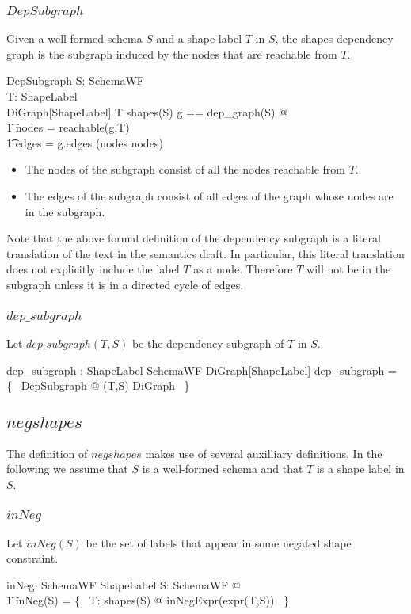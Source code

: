 \documentclass{article}
\begin{document}
\subsubsection{$DepSubgraph$}
Given a well-formed schema $S$ and a shape label $T$ in $S$, the shapes dependency
graph is the subgraph induced by the nodes that are reachable from $T$.
\begin{schema}{DepSubgraph}
	S: SchemaWF \\
	T: ShapeLabel \\
	DiGraph[ShapeLabel]
\where
	T \in shapes(S)
\also
	\LET g == dep\_graph(S) @ \\
\t1		nodes = reachable(g,T) \land \\
\t1		edges = g.edges \cap (nodes \cross nodes)
\end{schema}
\begin{itemize}
\item The nodes of the subgraph consist of all the nodes reachable from $T$.
\item The edges of the subgraph consist of all edges of the graph whose nodes are in the subgraph.
\end{itemize}

Note that the above formal definition of the dependency subgraph is a literal translation of the text in the semantics draft.
In particular, this literal translation does not explicitly include the label $T$ as a node.
Therefore $T$ will not be in the subgraph unless it is in a directed cycle of edges.

\subsubsection{$dep\_subgraph$}
Let $dep\_subgraph(T,S)$ be the dependency subgraph of $T$ in $S$.
\begin{axdef}
	dep\_subgraph : ShapeLabel \cross SchemaWF \pfun DiGraph[ShapeLabel]
\where
	dep\_subgraph = \{~ DepSubgraph @ (T,S) \mapsto \theta DiGraph ~\}
\end{axdef}

\subsection{$negshapes$}
The definition of $negshapes$ makes use of several auxilliary definitions. 
In the following we assume that $S$ is a well-formed schema and that $T$ is a shape label in $S$.

\subsubsection{$inNeg$}
Let $inNeg(S)$ be the set of labels that appear in some negated shape constraint.
\begin{axdef}
	inNeg: SchemaWF \fun \finset ShapeLabel
\where
	\forall S: SchemaWF @ \\
\t1		inNeg(S) = \bigcup \{~ T: shapes(S) @ inNegExpr(expr(T,S)) ~\}
\end{axdef}
\end{document}
